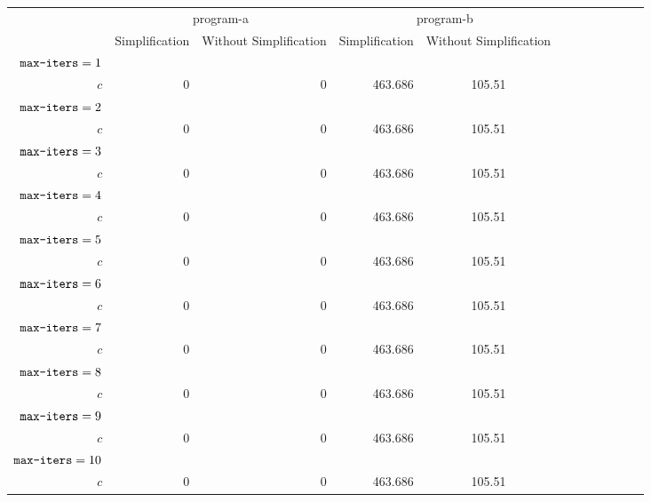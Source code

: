 \documentclass{article}
\begin{document}
\newcommand{\ra}[1]{\renewcommand{\arraystretch}{#1}}
\begin{table*}\centering
\ra{0.8}
\begin{tabular}{@{}rrrrcrrrcrrr@{}}
\toprule&\multicolumn{2}{c}{program-a} &\multicolumn{2}{c}{program-b} &\\
\cmidrule{2-3}\cmidrule{4-5}
& Simplification & Without Simplification & Simplification & Without Simplification\\ \midrule
$\verb|max-iters|=1$\\
$c$ & 0 & 0 & 463.686 & 105.51\\
$\verb|max-iters|=2$\\
$c$ & 0 & 0 & 463.686 & 105.51\\
$\verb|max-iters|=3$\\
$c$ & 0 & 0 & 463.686 & 105.51\\
$\verb|max-iters|=4$\\
$c$ & 0 & 0 & 463.686 & 105.51\\
$\verb|max-iters|=5$\\
$c$ & 0 & 0 & 463.686 & 105.51\\
$\verb|max-iters|=6$\\
$c$ & 0 & 0 & 463.686 & 105.51\\
$\verb|max-iters|=7$\\
$c$ & 0 & 0 & 463.686 & 105.51\\
$\verb|max-iters|=8$\\
$c$ & 0 & 0 & 463.686 & 105.51\\
$\verb|max-iters|=9$\\
$c$ & 0 & 0 & 463.686 & 105.51\\
$\verb|max-iters|=10$\\
$c$ & 0 & 0 & 463.686 & 105.51\\
\bottomrule
\end{tabular}
\end{table*}
\end{document}
